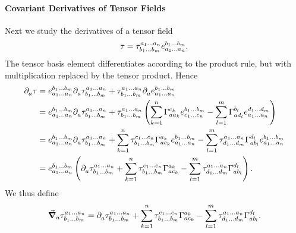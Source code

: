 \paragraph{Covariant Derivatives of Tensor Fields}
Next we study the derivatives of a tensor field
\begin{align*}
	\tau = \tensor*{\tau}{^{a_{1}\dots a_{n}}_{b_{1}\dots b_{m}}}\tensor*{e}{^{b_{1}\dots b_{m}}_{a_{1}\dots a_{n}}}.
\end{align*}
The tensor basis element differentiates according to the product rule, but with multiplication replaced by the tensor product. Hence
\begin{align*}
	\del{a}{\tau} &= \tensor*{e}{^{b_{1}\dots b_{m}}_{a_{1}\dots a_{n}}}\del{a}{\tensor*{\tau}{^{a_{1}\dots a_{n}}_{b_{1}\dots b_{m}}}} + \tensor*{\tau}{^{a_{1}\dots a_{n}}_{b_{1}\dots b_{m}}}\del{a}{\tensor*{e}{^{b_{1}\dots b_{m}}_{a_{1}\dots a_{n}}}} \\
	              &= \tensor*{e}{^{b_{1}\dots b_{m}}_{a_{1}\dots a_{n}}}\del{a}{\tensor*{\tau}{^{a_{1}\dots a_{n}}_{b_{1}\dots b_{m}}}} + \tensor*{\tau}{^{a_{1}\dots a_{n}}_{b_{1}\dots b_{m}}}\left(\sum\limits_{k = 1}^{n}\chris{c_{k}}{a}{a_{k}}\tensor*{e}{^{b_{1}\dots b_{m}}_{c_{1}\dots c_{n}}} - \sum\limits_{l = 1}^{m}\chris{b_{l}}{a}{d_{l}}\tensor*{e}{^{d_{1}\dots d_{m}}_{a_{1}\dots a_{n}}}\right) \\
	              &= \tensor*{e}{^{b_{1}\dots b_{m}}_{a_{1}\dots a_{n}}}\del{a}{\tensor*{\tau}{^{a_{1}\dots a_{n}}_{b_{1}\dots b_{m}}}} + \sum\limits_{k = 1}^{n}\tensor*{\tau}{^{c_{1}\dots c_{n}}_{b_{1}\dots b_{m}}}\chris{a_{k}}{a}{c_{k}}\tensor*{e}{^{b_{1}\dots b_{m}}_{a_{1}\dots a_{n}}} - \sum\limits_{l = 1}^{m}\tensor*{\tau}{^{a_{1}\dots a_{n}}_{d_{1}\dots d_{m}}}\chris{d_{l}}{a}{b_{l}}\tensor*{e}{^{b_{1}\dots b_{m}}_{a_{1}\dots a_{n}}} \\
	              &= \tensor*{e}{^{b_{1}\dots b_{m}}_{a_{1}\dots a_{n}}}\left(\del{a}{\tensor*{\tau}{^{a_{1}\dots a_{n}}_{b_{1}\dots b_{m}}}} + \sum\limits_{k = 1}^{n}\tensor*{\tau}{^{c_{1}\dots c_{n}}_{b_{1}\dots b_{m}}}\chris{a_{k}}{a}{c_{k}} - \sum\limits_{l = 1}^{m}\tensor*{\tau}{^{a_{1}\dots a_{n}}_{d_{1}\dots d_{m}}}\chris{d_{l}}{a}{b_{l}}\right).
\end{align*}
We thus define
\begin{align*}
	\dcov{a}{\tensor*{\tau}{^{a_{1}\dots a_{n}}_{b_{1}\dots b_{m}}}} = \del{a}{\tensor*{\tau}{^{a_{1}\dots a_{n}}_{b_{1}\dots b_{m}}}} + \sum\limits_{k = 1}^{n}\tensor*{\tau}{^{c_{1}\dots c_{n}}_{b_{1}\dots b_{m}}}\chris{a_{k}}{a}{c_{k}} - \sum\limits_{l = 1}^{m}\tensor*{\tau}{^{a_{1}\dots a_{n}}_{d_{1}\dots d_{m}}}\chris{d_{l}}{a}{b_{l}}.
\end{align*}

